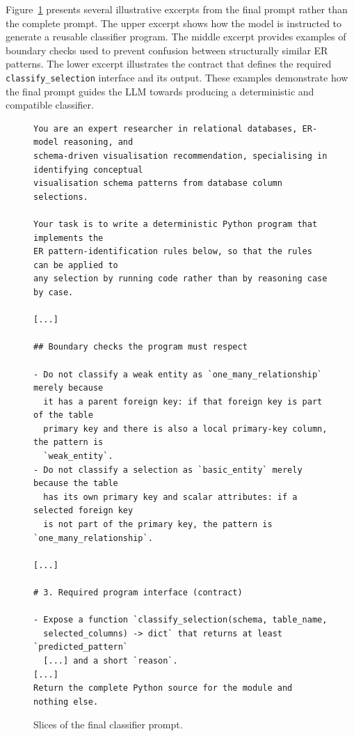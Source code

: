 Figure~\ref{lst:prompt-step1} presents several illustrative excerpts from the final prompt rather than the complete prompt. The upper excerpt shows how the model is instructed to generate a reusable classifier program. The middle excerpt provides examples of boundary checks used to prevent confusion between structurally similar ER patterns. The lower excerpt illustrates the contract that defines the required \texttt{classify\_selection} interface and its output. These examples demonstrate how the final prompt guides the LLM towards producing a deterministic and compatible classifier.


\begin{figure}[htbp]
\begin{lstlisting}[style=prompt]
You are an expert researcher in relational databases, ER-model reasoning, and 
schema-driven visualisation recommendation, specialising in identifying conceptual 
visualisation schema patterns from database column selections.

Your task is to write a deterministic Python program that implements the
ER pattern-identification rules below, so that the rules can be applied to
any selection by running code rather than by reasoning case by case.

[...]

## Boundary checks the program must respect

- Do not classify a weak entity as `one_many_relationship` merely because
  it has a parent foreign key: if that foreign key is part of the table
  primary key and there is also a local primary-key column, the pattern is
  `weak_entity`.
- Do not classify a selection as `basic_entity` merely because the table
  has its own primary key and scalar attributes: if a selected foreign key
  is not part of the primary key, the pattern is `one_many_relationship`.

[...]

# 3. Required program interface (contract)

- Expose a function `classify_selection(schema, table_name,
  selected_columns) -> dict` that returns at least `predicted_pattern`
  [...] and a short `reason`.
[...]
Return the complete Python source for the module and nothing else.
\end{lstlisting}
\caption{Slices of the final classifier prompt.}
\label{lst:prompt-step1}
\end{figure}

